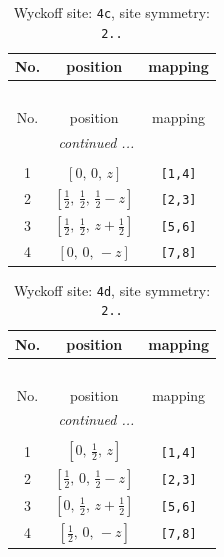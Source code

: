 \documentclass[fleqn,8pt]{jsarticle}
\begin{document}
\renewcommand{\arraystretch}{1.2}
\begin{longtable}{ccc}
\caption{Wyckoff site: {\tt 4c}, site symmetry: {\tt 2..}}
 \\
 \hline \hline
No. & position & mapping \\ \hline \endfirsthead

\multicolumn{2}{l}{\tablename\ \thetable{}} \\
 \hline \hline
No. & position & mapping \\ \hline \endhead

 \hline \hline
\multicolumn{2}{r}{\footnotesize\it continued ...} \\ \endfoot

 \hline \hline
\multicolumn{2}{r}{} \\ \endlastfoot

1 & $\left[ 0,\, 0,\, z \right]$ & {\tt [1,4]} \\ \hline
2 & $\left[ \frac{1}{2},\, \frac{1}{2},\, \frac{1}{2} - z \right]$ & {\tt [2,3]} \\ \hline
3 & $\left[ \frac{1}{2},\, \frac{1}{2},\, z + \frac{1}{2} \right]$ & {\tt [5,6]} \\ \hline
4 & $\left[ 0,\, 0,\, - z \right]$ & {\tt [7,8]} \\
\end{longtable}
\renewcommand{\arraystretch}{1.2}
\begin{longtable}{ccc}
\caption{Wyckoff site: {\tt 4d}, site symmetry: {\tt 2..}}
 \\
 \hline \hline
No. & position & mapping \\ \hline \endfirsthead

\multicolumn{2}{l}{\tablename\ \thetable{}} \\
 \hline \hline
No. & position & mapping \\ \hline \endhead

 \hline \hline
\multicolumn{2}{r}{\footnotesize\it continued ...} \\ \endfoot

 \hline \hline
\multicolumn{2}{r}{} \\ \endlastfoot

1 & $\left[ 0,\, \frac{1}{2},\, z \right]$ & {\tt [1,4]} \\ \hline
2 & $\left[ \frac{1}{2},\, 0,\, \frac{1}{2} - z \right]$ & {\tt [2,3]} \\ \hline
3 & $\left[ 0,\, \frac{1}{2},\, z + \frac{1}{2} \right]$ & {\tt [5,6]} \\ \hline
4 & $\left[ \frac{1}{2},\, 0,\, - z \right]$ & {\tt [7,8]} \\
\end{longtable}
\end{document}

